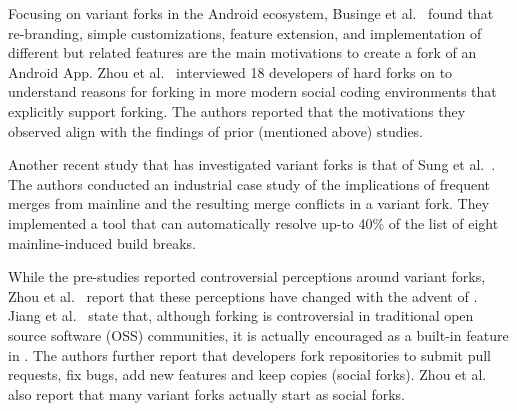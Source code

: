 
Focusing on variant forks in the Android ecosystem, Businge et al.~\cite{businge2018appfamilies} found that re-branding, simple customizations, feature extension, and implementation of different but related features are the main motivations to create a fork of an Android App.
Zhou et al.~\cite{Zhou:2020} interviewed 18 developers of hard forks on \gh to understand reasons for forking in more modern social coding environments that explicitly support forking. The authors reported that the motivations they observed align with the findings of prior (mentioned above) studies.

Another recent study that has investigated variant forks is that of Sung et al.~\cite{sung:ICSE:2020}. The authors conducted an industrial case study of the implications of frequent merges from mainline and the resulting merge conflicts in a variant fork. They implemented a tool that can automatically resolve up-to 40\% of the list of eight mainline-induced build breaks.

While the pre-\gh studies reported controversial perceptions around variant forks, Zhou et al.~\cite{Zhou:2020} report that these perceptions have changed with the advent of \gh. Jiang et al.~\cite{Lo:2017} state that, although forking is controversial in traditional open source software (OSS) communities, it is actually encouraged as a built-in feature in \gh. The authors further report that developers fork repositories to submit pull requests, fix bugs, add new features and keep copies (social forks).
Zhou et al.~\cite{Zhou:2020} also report that many variant forks actually start as social forks.

